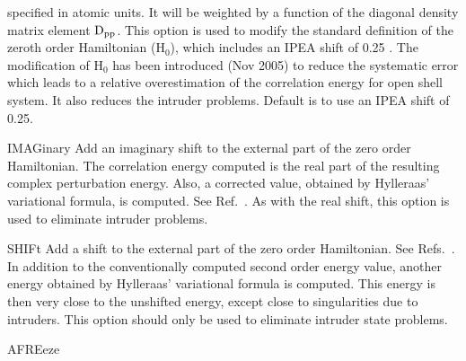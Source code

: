 \begin{keywordlist}
specified in atomic units. It will be weighted by a function of the
diagonal density matrix element $\rm D_{pp}$.
This option is used to modify the standard definition of the
zeroth order Hamiltonian (H$_0$), which includes an IPEA shift of 0.25
\cite{Ghigo:04a}. The modification of H$_0$ has been introduced (Nov 2005) to
reduce the systematic error which leads to a relative overestimation of the
correlation energy for open shell system. It also reduces the intruder problems.
Default is to use an IPEA shift of 0.25.
\item[IMAGinary]
Add an imaginary shift to the external part of the zero order
Hamiltonian. The correlation energy computed is the real part
of the resulting complex perturbation energy.
Also, a corrected
value, obtained by Hylleraas' variational formula, is computed.
See Ref.~\cite{Forsberg:96}.
As with the real shift, this option is used to eliminate intruder
problems.
\item[SHIFt]
Add a shift to the external part of the zero order Hamiltonian.
See Refs.~\cite{Forsberg:96,Roos:95b,Roos:96b}.
In addition to the conventionally computed second order energy
value, another energy obtained by Hylleraas' variational formula
is computed. This energy is then very close to the unshifted
energy, except close to singularities due to intruders.
This option should only be used to eliminate intruder state problems.
\item[AFREeze]

\end{keywordlist}
